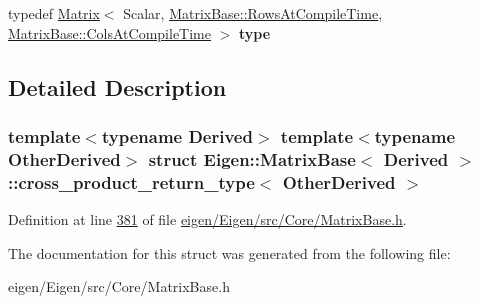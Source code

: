 \begin{DoxyCompactItemize}
\item 
\mbox{\label{struct_eigen_1_1_matrix_base_1_1cross__product__return__type_ad0d0f7a06c69ccea87a0ec5c397d8ec5}} 
typedef \hyperlink{group___core___module_class_eigen_1_1_matrix}{Matrix}$<$ Scalar, \hyperlink{group___core___module_a9784b8701c2d1c79fa8000e1b3ebdb8ba41d81bf4037b4d74c03b1242d8c133c0}{Matrix\+Base\+::\+Rows\+At\+Compile\+Time}, \hyperlink{group___core___module_a9784b8701c2d1c79fa8000e1b3ebdb8bac1b474fd08671c39df677c4acdbc8df0}{Matrix\+Base\+::\+Cols\+At\+Compile\+Time} $>$ {\bfseries type}
\end{DoxyCompactItemize}


\subsection{Detailed Description}
\subsubsection*{template$<$typename Derived$>$\newline
template$<$typename Other\+Derived$>$\newline
struct Eigen\+::\+Matrix\+Base$<$ Derived $>$\+::cross\+\_\+product\+\_\+return\+\_\+type$<$ Other\+Derived $>$}



Definition at line \hyperlink{eigen_2_eigen_2src_2_core_2_matrix_base_8h_source_l00381}{381} of file \hyperlink{eigen_2_eigen_2src_2_core_2_matrix_base_8h_source}{eigen/\+Eigen/src/\+Core/\+Matrix\+Base.\+h}.



The documentation for this struct was generated from the following file\+:\begin{DoxyCompactItemize}
\item 
eigen/\+Eigen/src/\+Core/\+Matrix\+Base.\+h\end{DoxyCompactItemize}
